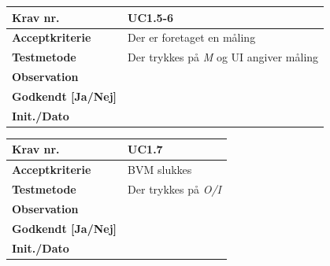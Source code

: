 \begin{table}[htb]
\begin{tabular}{|l|l|}
\hline
\textbf{Krav nr.}              & UC1.5-6  \\ \hline
\textbf{Acceptkriterie}        & Der er foretaget en måling\\ \hline
\textbf{Testmetode}            & Der trykkes på \textit{M} og UI angiver måling\\ \hline
\textbf{Observation}           &  \\ \hline
\textbf{Godkendt {[}Ja/Nej{]}} &  \\ \hline
\textbf{Init./Dato}            &  \\ \hline
\end{tabular}
\end{table}		

\begin{table}[htb]
\begin{tabular}{|l|l|}
\hline
\textbf{Krav nr.}              & UC1.7  \\ \hline
\textbf{Acceptkriterie}        & BVM slukkes\\ \hline
\textbf{Testmetode}            & Der trykkes på \textit{O/I} \\ \hline
\textbf{Observation}           &  \\ \hline
\textbf{Godkendt {[}Ja/Nej{]}} &  \\ \hline
\textbf{Init./Dato}            &  \\ \hline
\end{tabular}
\end{table}	
		
	
		